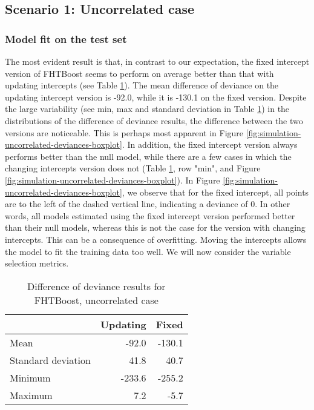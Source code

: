 \subsection{Scenario 1: Uncorrelated case}
\subsubsection{Model fit on the test set}
The most evident result is that, in contrast to our expectation, the fixed intercept version of FHTBoost seems to perform on average better than that with updating intercepts (see Table \ref{table:uncorrelated-deviance}).
The mean difference of deviance on the updating intercept version is -92.0, while it is -130.1 on the fixed version.
Despite the large variability (see min, max and standard deviation in Table \ref{table:uncorrelated-deviance}) in the distributions of the difference of deviance results, the difference between the two versions are noticeable.
This is perhaps most apparent in Figure \ref{fig:simulation-uncorrelated-deviances-boxplot}.
In addition, the fixed intercept version always performs better than the null model, while there are a few cases in which the changing intercepts version does not (Table \ref{table:uncorrelated-deviance}, row "min", and Figure \ref{fig:simulation-uncorrelated-deviances-boxplot}).
In Figure \ref{fig:simulation-uncorrelated-deviances-boxplot}, we observe that for the fixed intercept, all points are to the left of the dashed vertical line, indicating a deviance of 0.
In other words, all models estimated using the fixed intercept version performed better than their null models, whereas this is not the case for the version with changing intercepts.
This can be a consequence of overfitting.
Moving the intercepts allows the model to fit the training data too well.
We will now consider the variable selection metrics.

\begin{table}
\caption{Difference of deviance results for FHTBoost, uncorrelated case}
\label{table:uncorrelated-deviance}
\centering
\begin{tabular}{l|rr}
\toprule
& Updating & Fixed \\
\hline
Mean               &  -92.0  & -130.1  \\
Standard deviation &   41.8  &   40.7  \\
Minimum            & -233.6  & -255.2  \\
Maximum            &    7.2  &   -5.7  \\
\bottomrule
\end{tabular}
\end{table}

